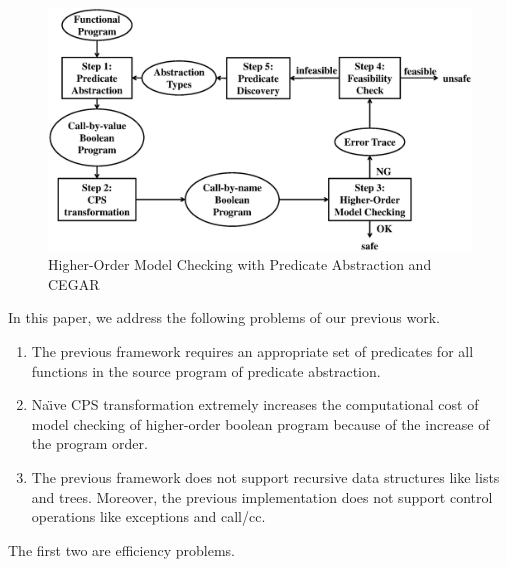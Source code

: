 \begin{figure}[tbp]
 \begin{center}
  \includegraphics[scale=0.4]{overall.eps}
 \end{center}
\caption{Higher-Order Model Checking with Predicate Abstraction and CEGAR }
\label{fig:cegar}
\end{figure}


In this paper, we address the following
problems of our previous work.
\begin{enumerate}
 \item The previous framework requires an appropriate set of predicates for all
       functions in the source program of predicate abstraction.
 \item Na\"{\i}ve CPS transformation extremely increases the computational cost
       of model checking of higher-order boolean program because of the
       increase of the program order.
 \item The previous framework does not support recursive data
       structures like lists and trees.  Moreover, the previous
       implementation does not support control operations like
       exceptions and call/cc.
\end{enumerate}
The first two are efficiency problems.

